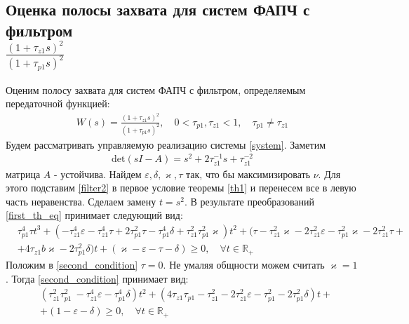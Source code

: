 \documentclass[a4paper,14pt]{article} %
\begin{document}
\subsection{Оценка полосы захвата для систем ФАПЧ с фильтром \\ $\frac{(1+\tau_{z1}s)^2}{(1+\tau_{p1}s)^2}$}
Оценим полосу захвата для систем ФАПЧ с фильтром, определяемым передаточной функцией:
 \begin{equation}\label{filter2}
 \begin{aligned}
W(s) = \frac{(1+\tau_{z1}s)^2}{(1+\tau_{p1}s)^2}, \quad 0<\tau_{p1},\tau_{z1} < 1, \quad \tau_{p1} \neq \tau_{z1}
 \end{aligned}
\end{equation}
Будем рассматривать управляемую реализацию системы \eqref{system}. Заметим
 \begin{equation}
 \begin{aligned}
\text{det}(sI-A) = s^2 + 2\tau_{z1}^{-1}s + \tau_{z1}^{-2}
 \end{aligned}
\end{equation}
матрица $A$ - устойчива. Найдем $\varepsilon, \delta, \varkappa, \tau$ так, что бы максимизировать $\nu$. Для этого подставим \eqref{filter2} в первое условие теоремы \ref{th1} и перенесем все в левую часть неравенства. Сделаем замену $t = s^2$. В результате преобразований \eqref{first_th_eq} принимает следующий вид:
 \begin{equation}\label{second_condition}
 \begin{aligned}
&\tau_{p1}^4\tau t^3 +(- \tau_{z1}^4\varepsilon - \tau_{z1}^4\tau + 2\tau_{p1}^2\tau- \tau_{p1}^4\delta + \tau_{z1}^2\tau_{p1}^2\varkappa)t^2 +( \tau- \tau_{z1}^2\varkappa - 2\tau_{z1}^2\varepsilon - \tau_{p1}^2\varkappa- 2\tau_{z1}^2\tau+ \\
&+ 4\tau_{z1}b\varkappa- 2\tau_{p1}^2\delta)t + (\varkappa-\varepsilon - \tau - \delta)  \geqslant 0, \quad \forall t \in \mathbb{R_+}
 \end{aligned}
\end{equation}
Положим в \eqref{second_condition} $\tau = 0$. Не умаляя общности можем считать $\varkappa = 1$. Тогда \eqref{second_condition} принимает вид:
 \begin{equation}\label{second_condition_tau_zero}
 \begin{aligned}
&(\tau_{z1}^2\tau_{p1}^2\ - \tau_{z1}^4\varepsilon - \tau_{p1}^4\delta)t^2 +( 4\tau_{z1}\tau_{p1} - \tau_{z1}^2 - 2\tau_{z1}^2\varepsilon - \tau_{p1}^2 - 2\tau_{p1}^2\delta)t + \\
&+ (1-\varepsilon - \delta)  \geqslant 0, \quad \forall t \in \mathbb{R_+}
 \end{aligned}
\end{equation}
\end{document}
